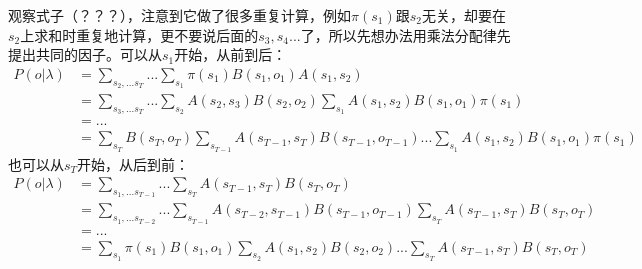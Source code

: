 \documentclass[11pt,a4paper]{article}
\begin{document}
观察式子（？？？），注意到它做了很多重复计算，例如$\pi(s_1)$跟$s_2$无关，却要在$s_2$上求和时重复地计算，更不要说后面的$s_3,s_4...$了，所以先想办法用乘法分配律先提出共同的因子。可以从$s_1$开始，从前到后：
\begin{equation}\begin{split}
P(o | \lambda)
& = \sum_{s_2, ... s_T} ... \sum_{s_1} \pi(s_1) B(s_1, o_1) A(s_1, s_2)\\
& = \sum_{s_3, ... s_T} ... \sum_{s_2} A(s_2, s_3) B(s_2, o_2) \sum_{s_1} A(s_1, s_2) B(s_1, o_1) \pi(s_1) \\
& = ...\\
& = \sum_{s_T} B(s_T, o_T) \sum_{s_{T - 1}} A(s_{T - 1}, s_T) B(s_{T - 1}, o_{T - 1}) ... \sum_{s_1} A(s_1, s_2) B(s_1, o_1) \pi(s_1) 
\end{split}\end{equation}
也可以从$s_T$开始，从后到前：
\begin{equation}\begin{split}
P(o | \lambda)
& = \sum_{s_1, ... s_{T - 1}} ... \sum_{s_T} A(s_{T - 1}, s_T) B(s_T, o_T)\\
& = \sum_{s_1, ... s_{T - 2}} ... \sum_{s_{T - 1}} A(s_{T - 2}, s_{T - 1}) B(s_{T - 1}, o_{T - 1}) \sum_{s_T} A(s_{T - 1}, s_T) B(s_T, o_T)\\
& = ...\\
& = \sum_{s_1} \pi(s_1) B(s_1, o_1) \sum_{s_2} A(s_1, s_2) B(s_2, o_2) ... \sum_{s_T} A(s_{T - 1}, s_T) B(s_T, o_T)
\end{split}\end{equation}
\end{document}
